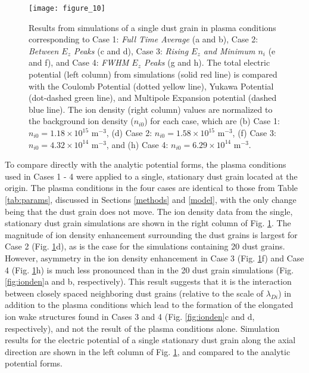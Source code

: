 \documentclass[aip,amsmath,amssymb,graphicx,floatfix,reprint]{revtex4-1}
\begin{document}
\begin{figure}
\texttt{[image: figure\_10]}
\caption{Results from simulations of a single dust grain in plasma conditions corresponding to Case 1: \emph{Full Time Average} (a and b), Case 2: \emph{Between $E_z$ Peaks} (c and d), Case 3: \emph{Rising $E_z$ and Minimum $n_i$} (e and f), and Case 4: \emph{FWHM $E_z$ Peaks} (g and h).  The total electric potential (left column) from simulations (solid red line) is compared with the Coulomb Potential (dotted yellow line), Yukawa Potential (dot-dashed green line), and Multipole Expansion potential (dashed blue line).  The ion density (right column) values are normalized to the background ion density ($n_{i0}$) for each case, which are (b) Case 1: $n_{i0} = 1.18\times 10^{15}$ m$^{-3}$, (d) Case 2: $n_{i0} = 1.58\times 10^{15}$ m$^{-3}$, (f) Case 3: $n_{i0} = 4.32\times 10^{14}$ m$^{-3}$, and (h) Case 4: $n_{i0} = 6.29\times 10^{14}$ m$^{-3}$.}
\label{fig:analytic_pot_comp}
\end{figure}

To compare directly with the analytic potential forms, the plasma conditions used in Cases 1 - 4 were applied to a single, stationary dust grain located at the origin.  The plasma conditions in the four cases are identical to those from Table \ref{tab:params}, discussed in Sections \ref{methods} and \ref{model}, with the only change being that the dust grain does not move.  The ion density data from the single, stationary dust grain simulations are shown in the right column of Fig. \ref{fig:analytic_pot_comp}.  The magnitude of ion density enhancement surrounding the dust grains is largest for Case 2 (Fig. \ref{fig:analytic_pot_comp}d), as is the case for the simulations containing 20 dust grains.  However, asymmetry in the ion density enhancement in Case 3 (Fig. \ref{fig:analytic_pot_comp}f) and Case 4 (Fig. \ref{fig:analytic_pot_comp}h) is much less pronounced than in the 20 dust grain simulations (Fig. \ref{fig:ionden}a and b, respectively).  This result suggests that it is the interaction between closely spaced neighboring dust grains (relative to the scale of $\lambda_{Di}$) in addition to the plasma conditions which lead to the formation of the elongated ion wake structures found in Cases 3 and 4 (Fig. \ref{fig:ionden}c and d, respectively), and not the result of the plasma conditions alone.  Simulation results for the electric potential of a single stationary dust grain along the axial direction are shown in the left column of Fig. \ref{fig:analytic_pot_comp}, and compared to the analytic potential forms. 
\end{document}

